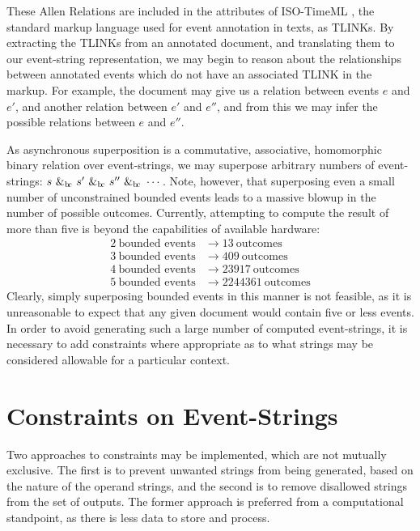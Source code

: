 \documentclass[a4paper,11pt]{article}
\newcommand{\bc}{{\rm b\!c}}
\begin{document}
These Allen Relations are included in the attributes of ISO-TimeML 
\citep{pustejovsky2010iso}, the standard 
markup language used for event annotation in texts, as TLINKs. By extracting 
the TLINKs from an annotated document, and translating them to our event-string 
representation, we may begin to reason about the relationships between 
annotated events which do not have an associated TLINK in the markup. For 
example, the document may give us a relation between events $e$ and $e'$, and 
another relation between $e'$ and $e''$, and from this we may infer the 
possible 
relations between $e$ and $e''$.

As asynchronous superposition is a commutative, associative, homomorphic binary 
relation over event-strings, we may superpose 
arbitrary numbers of event-strings: $s ~\&_{\bc}~ s' ~\&_{\bc}~ s'' ~\&_{\bc}~ 
\cdots$. Note, however, that superposing even a 
small number of unconstrained bounded events leads to a massive blowup in the 
number of possible outcomes. Currently, attempting to compute the result of 
more than five is beyond the capabilities of available hardware:
\begin{align*}
2 ~\mbox{bounded events} &\to 13 ~\mbox{outcomes}\\
3 ~\mbox{bounded events} &\to 409 ~\mbox{outcomes}\\
4 ~\mbox{bounded events} &\to 23917 ~\mbox{outcomes}\\
5 ~\mbox{bounded events} &\to 2244361 ~\mbox{outcomes}
\end{align*}
Clearly, simply superposing bounded events in this manner is not feasible, as 
it 
is unreasonable to expect that any given document would contain five or less 
events. In order to avoid generating such a large number of computed 
event-strings, it is necessary to add constraints where appropriate as to what 
strings may be considered allowable for a particular context.

\section{Constraints on Event-Strings}\label{constraints}
Two approaches to constraints may be implemented, which are not mutually 
exclusive. The first is to prevent unwanted strings from being generated, based 
on the nature of the operand strings, and the second is to remove disallowed 
strings from the set of outputs. The former approach is preferred from a 
computational standpoint, as there is less data to store and process.
\end{document}
